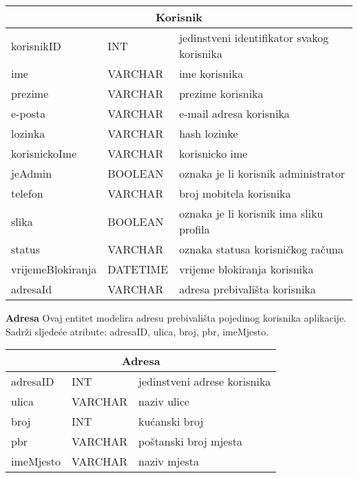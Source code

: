 			\begin{tabularx} {\textwidth} {|p{3.5cm}|p{2cm}|X|}
				
				\hline
				\multicolumn{3}{|c|}{\textbf{Korisnik}} \\
				\hline

				
				\cellcolor{LightGreen}korisnikID & INT	&   jedinstveni identifikator svakog korisnika 	\\ \hline
				ime	& VARCHAR &   ime korisnika	\\ \hline 
				prezime & VARCHAR &  prezime korisnika \\ \hline 
				e-posta & VARCHAR	&  	e-mail adresa korisnika	\\ \hline 
				lozinka & VARCHAR	&  	hash lozinke	\\ \hline
				korisnickoIme & VARCHAR	&  	korisnicko ime	\\ \hline
				jeAdmin & BOOLEAN	&  	oznaka je li korisnik administrator	\\ \hline
				telefon & VARCHAR	&  	broj mobitela korisnika	\\ \hline
				slika & BOOLEAN	&  	oznaka je li korisnik ima sliku profila	\\ \hline
				status & VARCHAR	&  	oznaka statusa korisničkog računa	\\ \hline
				vrijemeBlokiranja & DATETIME	&  vrijeme blokiranja korisnika		\\ \hline
				\cellcolor{LightBlue}adresaId & VARCHAR	&  	adresa prebivališta korisnika	\\ \hline
				
				
				
			\end{tabularx} 
			
			\bigskip
			\bigskip
			\textbf{Adresa} Ovaj entitet modelira adresu prebivališta pojedinog korisnika aplikacije.
			Sadrži sljedeće atribute: adresaID, ulica, broj, pbr, imeMjesto.
			\bigskip
			
			
			\begin{tabularx} {\textwidth} {|p{3.5cm}|p{2cm}|X|}

				\hline
				\multicolumn{3}{|c|}{\textbf{Adresa}} \\
				\hline
				
				\cellcolor{LightGreen}adresaID & INT	& jedinstveni adrese korisnika	\\ \hline
				ulica	& VARCHAR &  naziv ulice 	\\ \hline 
				broj & INT & kućanski broj  \\ \hline 
				pbr & VARCHAR	&  	poštanski broj mjesta	\\ \hline 
				imeMjesto & VARCHAR	&  naziv mjesta		\\ \hline
				
				
				
			\end{tabularx}
			
